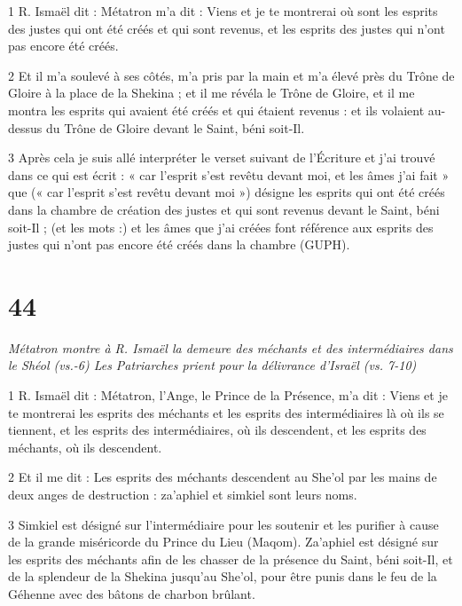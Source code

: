 \par 1 R. Ismaël dit : Métatron m'a dit : Viens et je te montrerai où sont les esprits des justes qui ont été créés et qui sont revenus, et les esprits des justes qui n'ont pas encore été créés.

\par 2 Et il m'a soulevé à ses côtés, m'a pris par la main et m'a élevé près du Trône de Gloire à la place de la Shekina ; et il me révéla le Trône de Gloire, et il me montra les esprits qui avaient été créés et qui étaient revenus : et ils volaient au-dessus du Trône de Gloire devant le Saint, béni soit-Il.

\par 3 Après cela je suis allé interpréter le verset suivant de l'Écriture et j'ai trouvé dans ce qui est écrit : « car l'esprit s'est revêtu devant moi, et les âmes j'ai fait » que (« car l'esprit s'est revêtu devant moi ») désigne les esprits qui ont été créés dans la chambre de création des justes et qui sont revenus devant le Saint, béni soit-Il ; (et les mots :) et les âmes que j'ai créées font référence aux esprits des justes qui n'ont pas encore été créés dans la chambre (GUPH).


\chapter{44}

\par \textit{Métatron montre à R. Ismaël la demeure des méchants et des intermédiaires dans le Shéol (vs.-6) Les Patriarches prient pour la délivrance d'Israël (vs. 7-10)}

\par 1 R. Ismaël dit : Métatron, l'Ange, le Prince de la Présence, m'a dit : Viens et je te montrerai les esprits des méchants et les esprits des intermédiaires là où ils se tiennent, et les esprits des intermédiaires, où ils descendent, et les esprits des méchants, où ils descendent.

\par 2 Et il me dit : Les esprits des méchants descendent au She'ol par les mains de deux anges de destruction : za'aphiel et simkiel sont leurs noms.

\par 3 Simkiel est désigné sur l'intermédiaire pour les soutenir et les purifier à cause de la grande miséricorde du Prince du Lieu (Maqom). Za'aphiel est désigné sur les esprits des méchants afin de les chasser de la présence du Saint, béni soit-Il, et de la splendeur de la Shekina jusqu'au She'ol, pour être punis dans le feu de la Géhenne avec des bâtons de charbon brûlant.

